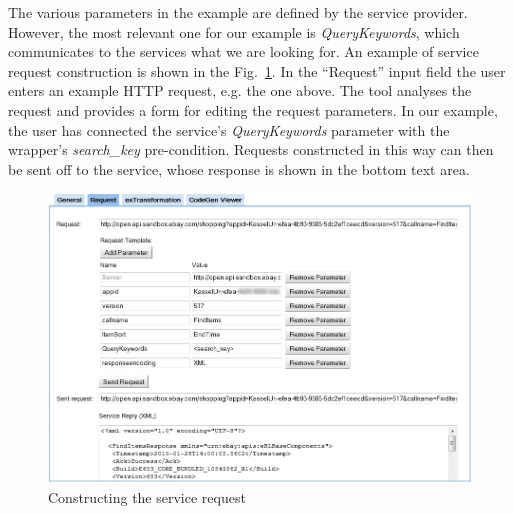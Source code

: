 


The various parameters in the example are defined by the service provider. However, the most relevant one for our example is \emph{QueryKeywords}, which communicates to the services what we are looking for. 
An example of service request construction is shown in the Fig.~\ref{fig:construct_service_request}. In the ``Request'' input field the user enters an example HTTP request, e.g. the one above. The tool analyses the request and provides a form for editing the request parameters. In our example, the user has connected the service's \textit{QueryKeywords} parameter with the wrapper's \textit{search\_key} pre-condition. Requests constructed in this way can then be sent off to the service, whose response is shown in the bottom text area.

\begin{figure}[ht]
  \begin{center}
    \includegraphics[width=\linewidth]{images/ServiceWrapperToolGVSWithRequestExample.png}
    \caption{Constructing the service request}
    \label{fig:construct_service_request}
  \end{center}
\end{figure}

